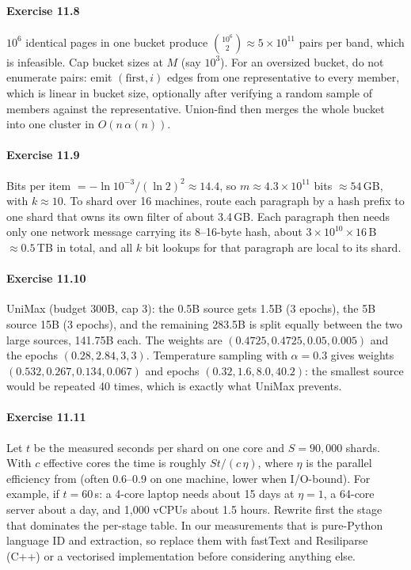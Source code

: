 \paragraph{Exercise 11.8} $10^{6}$ identical pages in one bucket produce
$\binom{10^6}{2}\approx5\times10^{11}$ pairs per band, which is infeasible. Cap bucket sizes at $M$
(say $10^{3}$). For an oversized bucket, do not enumerate pairs: emit $(\text{first},i)$ edges from
one representative to every member, which is linear in bucket size, optionally after verifying a
random sample of members against the representative. Union-find then merges the whole bucket into one
cluster in $O(n\,\alpha(n))$.

\paragraph{Exercise 11.9} Bits per item $= -\ln 10^{-3}/(\ln2)^2\approx14.4$, so
$m\approx4.3\times10^{11}$ bits $\approx54$\,GB, with $k\approx10$. To shard over 16 machines, route
each paragraph by a hash prefix to one shard that owns its own filter of about 3.4\,GB. Each paragraph then
needs only one network message carrying its 8--16-byte hash, about $3\times10^{10}\times16$\,B $\approx
0.5$\,TB in total, and all $k$ bit lookups for that paragraph are local to its shard.

\paragraph{Exercise 11.10} UniMax (budget 300B, cap 3): the 0.5B source gets 1.5B (3 epochs), the 5B
source 15B (3 epochs), and the remaining 283.5B is split equally between the two large sources, 141.75B
each. The weights are $(0.4725, 0.4725, 0.05, 0.005)$ and the epochs $(0.28, 2.84, 3, 3)$. Temperature sampling
with $\alpha=0.3$ gives weights $(0.532,0.267,0.134,0.067)$ and epochs $(0.32, 1.6, 8.0, 40.2)$: the
smallest source would be repeated 40 times, which is exactly what UniMax prevents.

\paragraph{Exercise 11.11} Let $t$ be the measured seconds per shard on one core and $S=90{,}000$
shards. With $c$ effective cores the time is roughly $S t / (c\,\eta)$, where $\eta$ is the parallel efficiency
from  (often 0.6--0.9 on one machine, lower when I/O-bound). For example, if
$t=60$\,s: a 4-core laptop needs about 15 days at $\eta=1$, a 64-core server about a day, and 1{,}000 vCPUs about 1.5
hours. Rewrite first the stage that dominates the per-stage table. In our measurements that is
pure-Python language ID and extraction, so replace them with fastText and Resiliparse (C++)
or a vectorised implementation before considering anything else.
